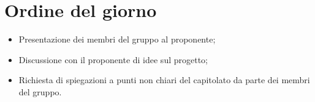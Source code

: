 \section*{Ordine del giorno}
\begin{itemize}
\item Presentazione dei membri del gruppo al proponente;
\item Discussione con il proponente di idee sul progetto;
\item Richiesta di spiegazioni a punti non chiari del capitolato da parte dei membri del gruppo.
\end{itemize}